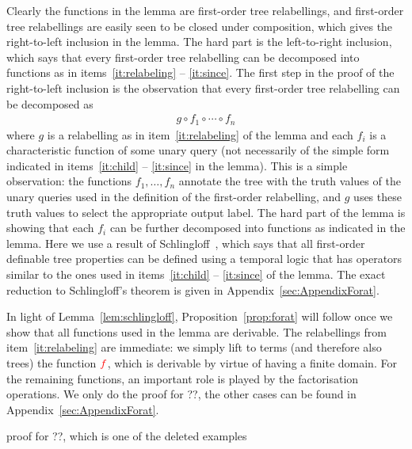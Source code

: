 Clearly the functions in the lemma are first-order tree relabellings, and first-order tree relabellings are easily seen to be closed under composition, which gives the right-to-left inclusion in the lemma. The hard part is the left-to-right inclusion, which says that every first-order tree relabelling can be decomposed into functions as in items~\ref{it:relabeling} -- \ref{it:since}. 
The first  step in the proof of  the right-to-left inclusion is the observation that  every first-order tree relabelling can be decomposed as 
\begin{align*}
    g \circ f_1 \circ \cdots \circ f_n
\end{align*}
where $g$ is a relabelling as in item~\ref{it:relabeling} of the lemma and each $f_i$ is a  characteristic function of some unary query (not necessarily of the simple form indicated in items~\ref{it:child} -- \ref{it:since} in the lemma). This is a simple observation: the functions $f_1,\ldots,f_n$ annotate the tree with the truth values of the unary queries used in the definition of the  first-order relabelling, and $g$ uses these truth values to select the appropriate output label. The hard part of the lemma is showing that each $f_i$  can be further decomposed into functions as indicated in the lemma. Here we use a result of Schlingloff~\cite[Theorem 2.6]{schlingloff1992expressive}, which says that all first-order definable tree properties can be defined using a temporal logic that has operators similar to the ones used in items~\ref{it:child} -- \ref{it:since} of the lemma. The exact reduction to Schlingloff's theorem is given in Appendix~\ref{sec:AppendixForat}.

In light of Lemma~\ref{lem:schlingloff},  Proposition~\ref{prop:forat} will follow once we  show that all functions  used in the lemma are derivable. The relabellings from item~\ref{it:relabeling} are immediate: we simply lift to terms (and therefore also trees) the function ${\color{red}{f}}$, which is derivable by virtue of having a finite domain. For the remaining functions, an important role is played by the factorisation operations. We only do the proof for ??, the other cases can be found in Appendix~\ref{sec:AppendixForat}. 

\begin{center}
    proof for ??, which is one of the deleted examples
\end{center}